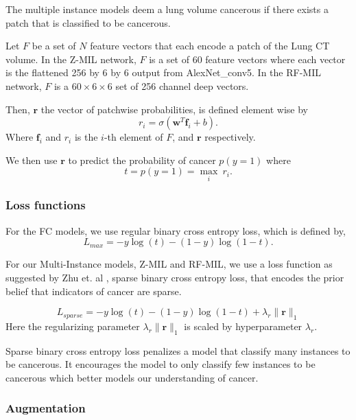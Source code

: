 \documentclass[twocolumn,10pt]{article}
\renewcommand{\b}{\boldsymbol}
\begin{document}
The multiple instance models deem a lung volume cancerous if there exists
a patch that is classified to be cancerous.

Let $F$ be a set of $N$ feature vectors that each encode a patch of the Lung
CT volume. In the Z-MIL network, $F$ is a set of 60 feature vectors where
each vector is the flattened 256 by 6 by 6 output from AlexNet\_conv5. In the
RF-MIL network, $F$ is a $60 \times 6 \times 6$ set of 256 channel deep vectors.

Then, $\b r$ the vector of patchwise probabilities, is defined element wise by
\begin{equation}
r_i = \sigma(\b w^T \b f_i + b).
\end{equation}
Where $\b f_i$ and $r_i$ is the $i$-th element of $F$, and $\b r$ respectively.

We then use $\b r $ to predict the probability of cancer $p(y = 1)$ where
\begin{equation}
t = p(y = 1) = \max_{i} \ r_i.
\end{equation}

\subsubsection{Loss functions}
For the FC models, we use regular binary cross entropy loss, which is defined by,
\begin{equation}
L_{max} = -y\log(t) - (1-y)\log(1-t).
\end{equation}

For our Multi-Instance models, Z-MIL and RF-MIL, we use a loss function 
as suggested by Zhu et. al \cite{DBLP:journals/corr/ZhuLVX16}, sparse binary cross
entropy loss, that encodes the
prior belief that indicators of cancer are sparse.

\begin{equation}L_{sparse} = -y\log(t) - (1-y)\log(1-t)+ \lambda_r\|\b r\|_1
\end{equation}
Here the regularizing parameter $\lambda_r\|\b r\|_1$ is scaled by
hyperparameter $\lambda_r$.

Sparse binary cross entropy loss penalizes a model that classify many instances 
to be cancerous. It encourages the model to only classify
few instances to be cancerous which better models our understanding of 
cancer.

\subsubsection{Augmentation}
\end{document}
